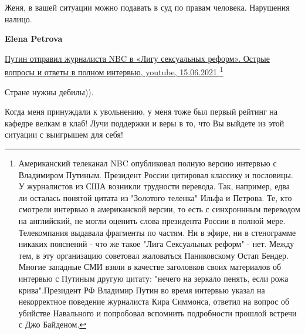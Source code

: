 \begin{itemize}
Женя, в вашей ситуации можно подавать в суд по правам человека. Нарушения налицо.

\begin{itemize}
 
\textbf{Elena Petrova} 

\href{https://www.youtube.com/watch?v=L5Yszu1Zb6g}{%
Путин отправил журналиста NBC в «Лигу сексуальных реформ». Острые вопросы и ответы в полном интервью,%
youtube, 15.06.2021
}\footnote{
Американский телеканал NBC опубликовал полную версию интервью с Владимиром
Путиным. Президент России цитировал классику и пословицы. У журналистов из США
возникли трудности перевода. Так, например, едва ли осталась понятой цитата из
"Золотого теленка" Ильфа и Петрова. Те, кто смотрели интервью в американской
версии, то есть с синхроннным переводом на английский, не могли оценить слова
президента России в полной мере. Телекомпания выдавала фрагменты по частям. Ни
в эфире, ни в стенограмме никаких пояснений - что же такое "Лига Сексуальных
реформ" - нет. Между тем, в эту организацию советовал жаловаться Паниковскому
Остап Бендер. Многие западные СМИ взяли в качестве заголовков своих материалов
об интервью с Путиным другую цитату: "нечего на зеркало пенять, если рожа
крива".Президент РФ Владимир Путин во время интервью указал на некорректное
поведение журналиста Кира Симмонса, ответил на вопрос об убийстве Навального и
попробовал вспомнить подробности прошлой встречи с Джо Байденом. 
}
\end{itemize}

 
Стране нужны дебилы)).

 

Когда меня принуждали к увольнению, у меня тоже был первый рейтинг на кафедре
\Smiley[1.0][yellow] велкам в клаб! Лучи поддержки и веры в то, что Вы выйдете из этой ситуации с
выигрышем для себя!


\end{itemize}
